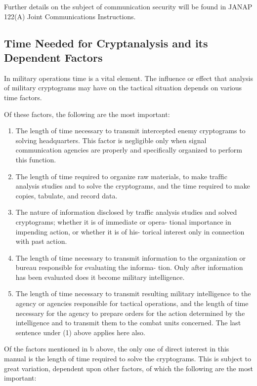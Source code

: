\mypara Further details on the subject of communication security will be
found in JANAP 122(A) Joint Communications Instructions.

\subsection{Time Needed for Cryptanalysis and its Dependent Factors}

\mypara In military operations time is a vital element. The inﬂuence or effect
that analysis of military cryptograms may have on the tactical situation
depends on various time factors.

\mypara Of these factors, the following are the most important:

\begin{enumerate}
\item The length of time necessary to transmit intercepted enemy
cryptograms to solving headquarters. This factor is negligible
only when signal communication agencies are properly and
speciﬁcally organized to perform this function.

\item The length of time required to organize raw materials, to make
trafﬁc analysis studies and to solve the cryptograms, and the
time required to make copies, tabulate, and record data.

\item The nature of information disclosed by traffic analysis studies
and solved cryptograms; whether it is of immediate or opera-
tional importance in impending action, or whether it is of his-
torical interest only in connection with past action.

\item The length of time necessary to transmit information to the
organization or bureau responsible for evaluating the informa-
tion. Only after information has been evaluated does it become
military intelligence.

\item The length of time necessary to transmit resulting military
intelligence to the agency or agencies responsible for tactical
operations, and the length of time necessary for the agency to
prepare orders for the action determined by the intelligence and
to transmit them to the combat units concerned. The last
sentence under (1) above applies here also.
\end{enumerate}

\mypara Of the factors mentioned in b above, the only one of direct interest
in this manual is the length of time required to solve the cryptograms.
This is subject to great variation, dependent upon other factors, of
which the following are the most important:

